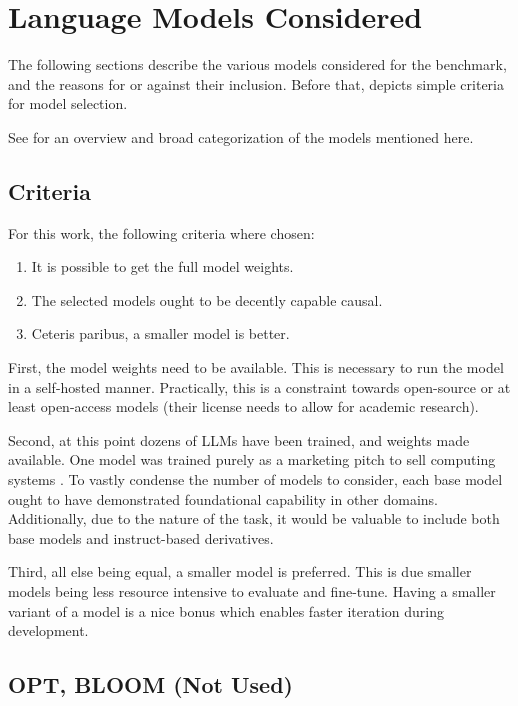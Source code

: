 \section{Language Models Considered}\label{sec:models}
The following sections describe the various models considered for the benchmark, and the reasons for or against their inclusion.
Before that,  depicts simple criteria for model selection.

See  for an overview and broad categorization of the models mentioned here.


\subsection{Criteria}\label{sub:criteria}
For this work, the following criteria where chosen:
\begin{enumerate}
    \item It is possible to get the full model weights.
    \item The selected models ought to be decently capable \gls{causal}.
    \item Ceteris paribus, a smaller model is better.
\end{enumerate}

First, the model weights need to be available. This is necessary to run the model in a self-hosted manner.
Practically, this is a constraint towards open-source or at least open-access models (their license needs to allow for academic research).

Second, at this point dozens of \glspl{LLM} have been trained, and weights made available.
One model was trained purely as a marketing pitch to sell computing systems \cite{dey_cerebrasgpt_2023}.
To vastly condense the number of models to consider, each base model ought to have demonstrated foundational capability in other domains.
Additionally, due to the nature of the task, it would be valuable to include both base models and instruct-based derivatives.

Third, all else being equal, a smaller model is preferred.
This is due smaller models being less resource intensive to evaluate and fine-tune.
Having a smaller variant of a model is a nice bonus which enables faster iteration during development.


\subsection{OPT, BLOOM (Not Used)}
